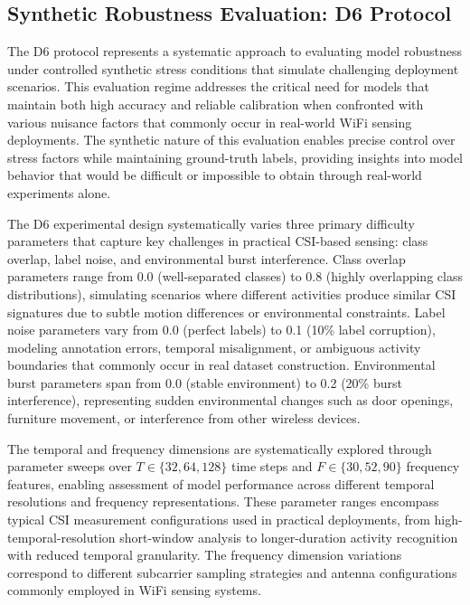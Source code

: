 \documentclass[journal]{IEEEtran}
\begin{document}
\subsection{Synthetic Robustness Evaluation: D6 Protocol}

The D6 protocol represents a systematic approach to evaluating model robustness under controlled synthetic stress conditions that simulate challenging deployment scenarios. This evaluation regime addresses the critical need for models that maintain both high accuracy and reliable calibration when confronted with various nuisance factors that commonly occur in real-world WiFi sensing deployments. The synthetic nature of this evaluation enables precise control over stress factors while maintaining ground-truth labels, providing insights into model behavior that would be difficult or impossible to obtain through real-world experiments alone.

The D6 experimental design systematically varies three primary difficulty parameters that capture key challenges in practical CSI-based sensing: class overlap, label noise, and environmental burst interference. Class overlap parameters range from 0.0 (well-separated classes) to 0.8 (highly overlapping class distributions), simulating scenarios where different activities produce similar CSI signatures due to subtle motion differences or environmental constraints. Label noise parameters vary from 0.0 (perfect labels) to 0.1 (10\% label corruption), modeling annotation errors, temporal misalignment, or ambiguous activity boundaries that commonly occur in real dataset construction. Environmental burst parameters span from 0.0 (stable environment) to 0.2 (20\% burst interference), representing sudden environmental changes such as door openings, furniture movement, or interference from other wireless devices.

The temporal and frequency dimensions are systematically explored through parameter sweeps over $T \in \{32, 64, 128\}$ time steps and $F \in \{30, 52, 90\}$ frequency features, enabling assessment of model performance across different temporal resolutions and frequency representations. These parameter ranges encompass typical CSI measurement configurations used in practical deployments, from high-temporal-resolution short-window analysis to longer-duration activity recognition with reduced temporal granularity. The frequency dimension variations correspond to different subcarrier sampling strategies and antenna configurations commonly employed in WiFi sensing systems.
\end{document}

